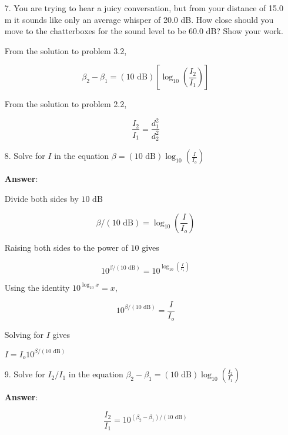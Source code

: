 \documentclass{article}
\begin{document}
\begin{enumerate}

  \item[7.] You are trying to hear a juicy conversation, but from your distance of 15.0 m it sounds like only an average whisper of 20.0 dB. How close should you move to the chatterboxes for the sound level to be 60.0 dB? Show your work.

            \ifsolutions
            From the solution to problem 3.2,

            $$\beta_2-\beta_1 = (10 \text{ dB})\left[\log_{10}\left(\frac{I_2}{I_1}\right)\right]$$

            From the solution to problem 2.2,

            $$\frac{I_2}{I_1} = \frac{d_1^2}{d_2^2}$$
            \else
            \vskip 96pt
            \fi

  \item[8.] Solve for $I$ in the equation $\beta = (10 \text{ dB})\log_{10}\left(\frac{I}{I_o}\right)$

            \ifsolutions
            \textbf{Answer}:

            Divide both sides by ${10 \text{ dB}}$

            $$\beta/(10 \text{ dB})  = \log_{10}\left(\frac{I}{I_o}\right)$$

            Raising both sides to the power of $10$ gives

            $$10^{\beta/(10 \text{ dB})} = 10^{\log_{10}\left(\frac{I}{I_o}\right)}$$

            Using the identity $10^{\log_{10}x} = x$,

            $$10^{\beta/(10 \text{ dB})} = \frac{I}{I_o}$$

            Solving for $I$ gives   

            $I=I_o 10^{\beta/(10\text{ dB})}$
            \else
            \vskip 96pt
            \fi

  \item[9.] Solve for $I_2/I_1$ in the equation $\beta_2-\beta_1 = (10 \text{ dB})\log_{10}\left(\frac{I_2}{I_1}\right)$

            \ifsolutions
            \textbf{Answer}:

            $$\frac{I_2}{I_1}=10^{(\beta_2-\beta_1)/(10\text{ dB})}$$
            \else
            \vskip 96pt
            \fi

\end{enumerate}
\end{document}

